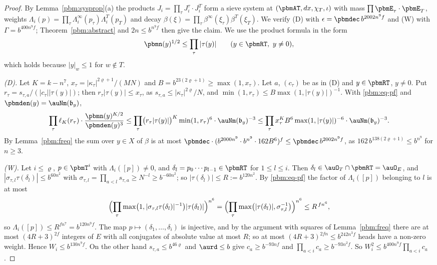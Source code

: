 \documentclass[10pt]{amsart}
\theoremstyle{definition}
\theoremstyle{remark}
\begin{document}
\begin{proof}
By Lemma~\ref{pbm:sysprop}(a) the products $J_i=\prod_\tau J^\tau_i\cdot J^T_i$ form a sieve system
at $(\pbmAT,dx,\chi_T,\iota)$ with mass $\prod\pbmE_\tau\cdot\pbmE_T$, weights $\Lambda_i(p)=\prod_\tau
\Lambda^\infty_i(p_\tau)\Lambda^T_i(p_T)$ and decay $\beta(\xi)=\prod_\tau\beta^\infty(\xi_\tau)\beta^T(
\xi_T)$. We verify (D) with $\epsilon=\pbmdec\,b^{2002n^9f}$ and (W) with $\Gamma=b^{400n^9f}$;
Theorem~\ref{pbm:abstract} and $2n\le b^{n^9f}$ then give the claim. We use the product formula in
the form
\begin{equation}\label{pbm:eq-pf}
\pbmn(y)^{1/2}\le\prod_\tau|\tau(y)|\qquad(y\in\pbmRT,\ y\ne0),
\end{equation}
which holds because $|y|_w\le1$ for $w\notin T$.

\emph{(D).} Let $K=k-n^7$, $x_\tau=|\kappa_\tau|^{2\varrho+1}/(MN)$ and $B=b^{23(2\varrho+1)}\ge\max(1,
x_\tau)$. Let $a$, $(c_\tau)$ be as in (D) and $y\in\pbmRT$, $y\ne0$. Put $r_\tau=s_{\tau,a}/(|c_\tau|
|\tau(y)|)$; then $r_\tau|\tau(y)|\le x_\tau$, as $s_{\tau,a}\le|\kappa_\tau|^{2\varrho}/N$, and
$\min(1,r_\tau)\le B\max(1,|\tau(y)|)^{-1}$. With \eqref{pbm:eq-pf} and $\pbmden(y)=\auNm(\mathfrak
b_y)$,
\[
\prod_\tau\ell_K(r_\tau)\cdot\frac{\pbmn(y)^{K/2}}{\pbmden(y)^3}\le\prod_\tau\bigl(r_\tau|\tau(y)|\bigr)^K
\min(1,r_\tau)^6\cdot\auNm(\mathfrak b_y)^{-3}\le\prod_\tau x_\tau^KB^6\max(1,|\tau(y)|)^{-6}\cdot\auNm(
\mathfrak b_y)^{-3}.
\]
By Lemma~\ref{pbm:freq} the sum over $y\in X$ of $\beta$ is at most $\pbmdec\cdot(b^{2000n^9}\cdot
b^{n^9}\cdot162B^6)^f\le\pbmdec\,b^{2002n^9f}$, as $162\,b^{138(2\varrho+1)}\le b^{n^9}$ for $n\ge3$.

\emph{(W).} Let $i\le\varrho$, $p\in\pbmT^i$ with $\Lambda_i([p])\ne0$, and $\delta_l=p_0\cdots p_{l-1}
\in\pbmRT$ for $1\le l\le i$. Then $\delta_l\in\auO_T\cap\pbmRT=\auO_E$, and $|\sigma_{\tau,l}\tau(\delta_l
)|\le b^{60n^2}$ with $\sigma_{\tau,l}=\prod_{a<l}s_{\tau,a}\ge N^{-l}\ge b^{-60n^2}$; so $|\tau(\delta_l)|
\le R:=b^{120n^2}$. By \eqref{pbm:eq-pf} the factor of $\Lambda_i([p])$ belonging to $l$ is at most
\[
\Bigl(\prod_\tau\max\bigl(1,|\sigma_{\tau,l}\tau(\delta_l)|^{-1}\bigr)|\tau(\delta_l)|\Bigr)^{n^6}=\Bigl(
\prod_\tau\max\bigl(|\tau(\delta_l)|,\sigma_{\tau,l}^{-1}\bigr)\Bigr)^{n^6}\le R^{\,fn^6},
\]
so $\Lambda_i([p])\le R^{fn^7}=b^{120n^9f}$. The map $p\mapsto(\delta_1,\dots,\delta_i)$ is injective,
and by the argument with squares of Lemma~\ref{pbm:freq} there are at most $(4R+3)^{2f}$ integers of
$E$ with all conjugates of absolute value at most $R$; so at most $(4R+3)^{2fn}\le b^{242n^3f}$
heads have a non-zero weight. Hence $W_i\le b^{130n^9f}$. On the other hand $s_{\tau,a}\le b^{46
\varrho}$ and $\aurd\le b$ give $c_a\ge b^{-93nf}$ and $\prod_{a<i}c_a\ge b^{-93n^2f}$. So $W_i^2\le
b^{400n^9f}\prod_{a<i}c_a$.
\end{proof}
\end{document}

